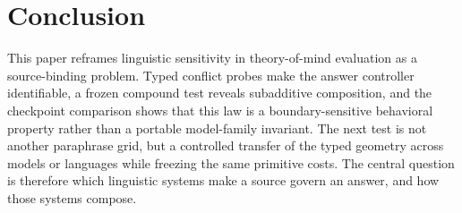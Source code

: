 \section{Conclusion}

This paper reframes linguistic sensitivity in theory-of-mind evaluation as a
source-binding problem. Typed conflict probes make the answer controller
identifiable, a frozen compound test reveals subadditive composition, and the
checkpoint comparison shows that this law is a boundary-sensitive behavioral
property rather than a portable model-family invariant. The next test is not
another paraphrase grid, but a controlled transfer of the typed geometry across
models or languages while freezing the same primitive costs. The central
question is therefore which linguistic systems make a source govern an answer,
and how those systems compose.
